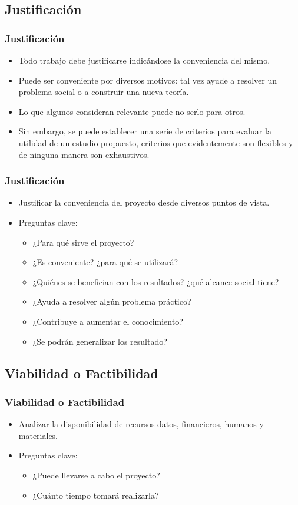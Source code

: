 \documentclass[aspectratio=169]{beamer}%
\begin{document}
\subsection{Justificación}
\begin{frame}[fragile]
\frametitle{\textbf{Justificación}}
\justifying
 \begin{itemize}
\item Todo trabajo debe justificarse indicándose la conveniencia del mismo.
\item Puede ser conveniente por diversos motivos: tal vez ayude a resolver un problema social o a construir una nueva teoría.
\item Lo que algunos consideran relevante puede no serlo para otros.
\item Sin embargo, se puede establecer una serie de criterios para evaluar la utilidad de un estudio propuesto, criterios que evidentemente son flexibles y de ninguna manera son exhaustivos.
\end{itemize}
\end{frame}


\begin{frame}[fragile]
\frametitle{\textbf{Justificación}}
\justifying
 \begin{itemize}
\item Justificar la conveniencia del proyecto desde diversos puntos de vista.
\item Preguntas clave:
  \begin{itemize}
  \item ¿Para qué sirve el proyecto?
  \item ¿Es conveniente? ¿para qué se utilizará?
  \item ¿Quiénes se benefician con los resultados? ¿qué alcance social tiene?
  \item ¿Ayuda a resolver algún problema práctico?
  \item ¿Contribuye a aumentar el conocimiento?
  \item ¿Se podrán generalizar los resultado?
\end{itemize}
\end{itemize}
\end{frame}

\subsection{Viabilidad o Factibilidad}
\begin{frame}[fragile]
\frametitle{\textbf{Viabilidad o Factibilidad}}
\justifying
\begin{itemize}
 \item Analizar la disponibilidad de recursos datos, financieros, humanos y materiales.
 \item Preguntas clave:
  \begin{itemize}\justifying
  \item ¿Puede llevarse a cabo el proyecto?
  \item ¿Cuánto tiempo tomará realizarla?
\end{itemize}
\end{itemize}

\end{frame}
\end{document}
